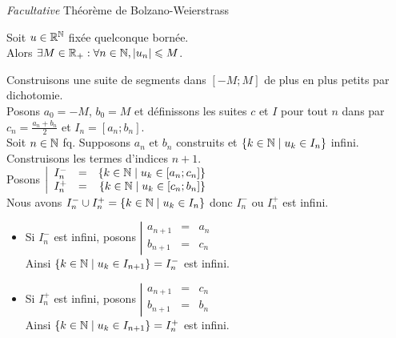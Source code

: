 \documentclass{article}
\begin{document}
\begin{question_kholle}
	{\emph{Facultative} Théorème de Bolzano-Weierstrass}

	Soit $u \in \mathbb R^{\mathbb N}$ fixée quelconque bornée. \\
	Alors $\exists M \in \mathbb R_+ : \forall n \in \mathbb N, |u_n| \leqslant M$.

	Construisons une suite de segments dans $[-M;M]$ de plus en plus petits par dichotomie. \\
	Posons $a_0 = -M$, $b_0 = M$ et définissons les suites $c$ et $I$ pour tout $n$ dans \N par $c_n = \frac{a_n + b_n}{2}$ et $I_n = [a_n;b_n]$. \\

	\noindent Soit $n\in \mathbb N$ fq.
	Supposons $a_n \text{ et } b_n$ construits et $\{ k \in \mathbb N \;|\; u_k \in I_n \}$ infini.
	Construisons les termes d'indices $n+1$. \\
	Posons $\left| \begin{array}{lcr}
			I_n^- & = & \{ k \in \mathbb N \;|\; u_k \in [a_n;c_n] \} \\
			I_n^+ & = & \{ k \in \mathbb N \;|\; u_k \in [c_n;b_n] \} \\
		\end{array} \right.$ \\
	Nous avons $I_n^- \cup I_n^+ = \{ k \in \mathbb N \;|\; u_k \in I_n \}$ donc $I_n^-$ ou $I_n^+$ est infini.

	\begin{itemize}
		\item Si $I_n^-$ est infini, posons $\left| \begin{array}{lcl}
				      a_{n+1} & = & a_n \\
				      b_{n+1} & = & c_n
			      \end{array} \right.$ \\
		      Ainsi $\{ k \in \mathbb N \;|\; u_k \in I_{n+1} \} = I_n^-$ est infini.
		\item Si $I_n^+$ est infini, posons $\left| \begin{array}{lcl}
				      a_{n+1} & = & c_n \\
				      b_{n+1} & = & b_n
			      \end{array} \right.$ \\
		      Ainsi $\{ k \in \mathbb N \;|\; u_k \in I_{n+1} \} = I_n^+$ est infini.
	\end{itemize}
	\bigbreak


\end{question_kholle}
\end{document}
